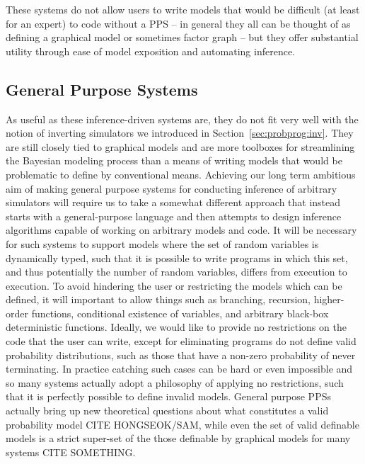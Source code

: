These systems do not allow users to write models that would be difficult (at least for
an expert) to code without a PPS -- in general they all can be thought of as defining a graphical model
or sometimes factor graph -- but they offer substantial utility through ease of model exposition and
automating inference.

\subsection{General Purpose Systems}
\label{sec:probprog:two:general}

As useful as these inference-driven systems are, they do not fit very well with the notion of
inverting simulators we introduced in Section~\ref{sec:probprog:inv}.  They are still closely tied
to graphical models and are more toolboxes for streamlining the Bayesian modeling process than
a means of writing models that would be problematic to define by conventional means.  Achieving
our long term ambitious aim of making general purpose systems for conducting inference of
arbitrary simulators will require us to take a somewhat different approach that instead starts
with a general-purpose language and then attempts to design inference algorithms capable of
working on arbitrary models and code.  It will be necessary for such systems to
support models where the set of random variables is dynamically typed, such that it is possible 
to write programs in which this set, and thus potentially the number of random variables, differs 
from execution to execution.  To avoid hindering the user or restricting the models which can be
defined, it will important to allow 
things such as branching, recursion, higher-order functions,
conditional existence of variables, and arbitrary black-box
deterministic functions.  Ideally, we would like to provide no restrictions on the code that the user
can write, except for eliminating programs do not define valid probability distributions, such as
those that have a non-zero probability of never terminating.  In practice catching such cases can
be hard or even impossible and so many systems actually adopt a philosophy of applying no restrictions,
such that it is perfectly possible to define invalid models.  General purpose PPSs actually bring up new
theoretical questions about what constitutes a valid probability model CITE HONGSEOK/SAM, while
even the set of valid definable models is a strict super-set of the those definable by graphical models 
for many systems CITE SOMETHING.

